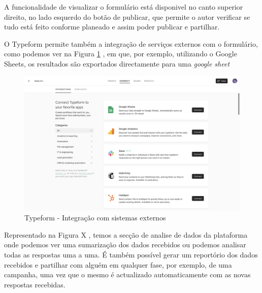 \newpage

 A funcionalidade de visualizar o formulário está disponivel no canto superior direito, no lado esquerdo do botão de publicar, que permite o autor verificar se tudo está feito conforme planeado e assim poder publicar e partilhar.
 
 O Typeform permite também a integração de serviços externos com o formulário, como podemos ver na Figura \ref{fig:tf-question-integration} , em que, por exemplo, utilizando o Google Sheets\cite{googlesheets}, os resultados são exportados directamente para uma \textit{google sheet}


\begin{figure}[ht!]
	\begin{center}
		\includegraphics[width=1\textwidth]{img/tf/tf-question-integration}
		\caption{Typeform - Integração com sistemas externos}
		\label{fig:tf-question-integration}
	\end{center}
\end{figure}

Representado na Figura X , temos a secção de analise de dados da plataforma onde podemos ver uma sumarização dos dados recebidos ou podemos analisar todas as respostas uma a uma. É também possível gerar um reportório dos dados recebidos e partilhar com alguém em qualquer fase, por exemplo, de uma campanha, uma vez que o mesmo é actualizado automaticamente com as novas respostas recebidas.

